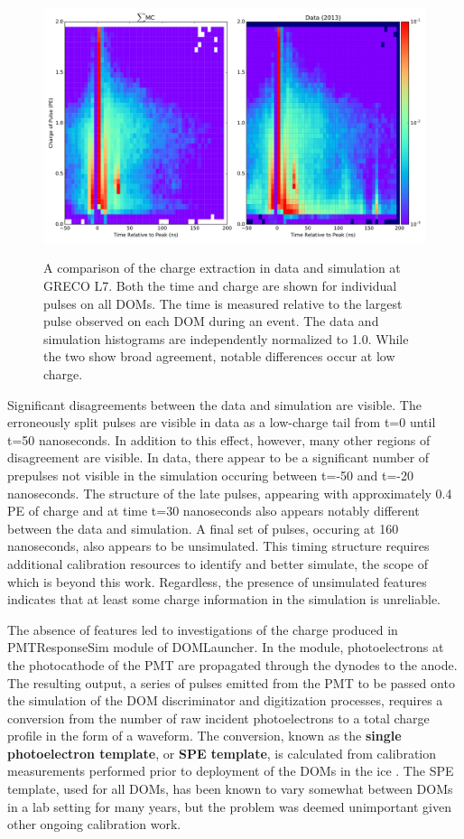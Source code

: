 \begin{center}
\begin{figure}
	\includegraphics[width=0.9\linewidth]{2d_maps_detail_raw.png}
\label{fig:pulse_timing_profile}
\caption{A comparison of the charge extraction in data and simulation at GRECO L7. Both the time and charge are shown for individual pulses on all DOMs. The time is measured relative to the largest pulse observed on each DOM during an event. The data and simulation histograms are independently normalized to 1.0. While the two show broad agreement, notable differences occur at low charge.}
\end{figure}
\end{center}

Significant disagreements between the data and simulation are visible.
The erroneously split pulses are visible in data as a low-charge tail from t=0 until t=50 nanoseconds.
In addition to this effect, however, many other regions of disagreement are visible.
In data, there appear to be a significant number of prepulses not visible in the simulation occuring between t=-50 and t=-20 nanoseconds.
The structure of the late pulses, appearing with approximately 0.4 PE of charge and at time t=30 nanoseconds also appears notably different between the data and simulation.
A final set of pulses, occuring at 160 nanoseconds, also appears to be unsimulated.
This timing structure requires additional calibration resources to identify and better simulate, the scope of which is beyond this work.
Regardless, the presence of unsimulated features indicates that at least some charge information in the simulation is unreliable.

The absence of features led to investigations of the charge produced in PMTResponseSim module of DOMLauncher.
In the module, photoelectrons at the photocathode of the PMT are propagated through the dynodes to the anode.
The resulting output, a series of pulses emitted from the PMT to be passed onto the simulation of the DOM discriminator and digitization processes, requires a conversion from the number of raw incident photoelectrons to a total charge profile in the form of a waveform.
The conversion, known as the \textbf{single photoelectron template}, or \textbf{SPE template}, is calculated from calibration measurements performed prior to deployment of the DOMs in the ice .
The SPE template, used for all DOMs, has been known to vary somewhat between DOMs in a lab setting for many years, but the problem was deemed unimportant given other ongoing calibration work.

